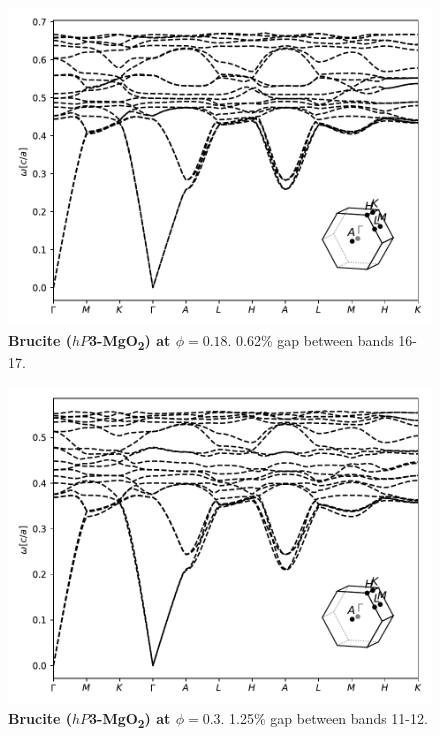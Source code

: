 \documentclass[fleqn,amsmath,amssymb,superscriptaddress, reprint,prl]{revtex4-1}
\begin{document}
\begin{figure}
\includegraphics[width=0.9\linewidth]{workspace/0b1daeb6d8c3b51cb2df6105804811e1/images/r=26.pdf}
	\caption{\textbf{Brucite ($hP$3-MgO\textsubscript{2}) at $\phi=0.18$}. 0.62\% gap between bands 16-17.}
\end{figure}

\begin{figure}
\includegraphics[width=0.9\linewidth]{workspace/0b1daeb6d8c3b51cb2df6105804811e1/images/r=31.pdf}
	\caption{\textbf{Brucite ($hP$3-MgO\textsubscript{2}) at $\phi=0.3$}. 1.25\% gap between bands 11-12.}
\end{figure}
\end{document}
